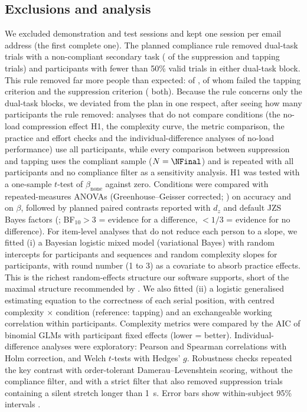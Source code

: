 \documentclass[11pt,a4paper]{article}
\begin{document}
\subsection{Exclusions and analysis}\label{sec:excl}
We excluded demonstration and test sessions and kept one session per email address (the first complete one). The planned
compliance rule removed dual-task trials with a non-compliant secondary task (\NInvalidTrials{} of the \NDualTrials{}
suppression and tapping trials) and participants with fewer than 50\% valid trials in either dual-task block. This rule
removed far more people than expected: \NExcluded{} of \NAll{}, of whom \NTapFail{} failed the tapping criterion and \NAsFail{}
the suppression criterion (\NBothFail{} both). Because the rule concerns only the dual-task blocks, we deviated from the plan
in one respect, after seeing how many participants the rule removed: analyses that do not compare conditions (the no-load compression effect
H1, the complexity curve, the metric comparison, the practice and effort checks and the individual-difference analyses of
no-load performance) use all \NAll{} participants, while every comparison between suppression and tapping uses the
compliant sample ($N = \NFinal$) and is repeated with all \NAll{} participants and no compliance filter as a sensitivity
analysis. H1 was tested with a one-sample $t$-test of $\beta_{\text{none}}$ against zero. Conditions were
compared with repeated-measures ANOVAs (Greenhouse--Geisser corrected; \citealp{greenhouse1959methods}) on accuracy and on
$\beta$, followed by planned paired contrasts reported with $d_z$ and default JZS Bayes factors (\citealp{rouder2009bayesian};
BF$_{10} > 3$ = evidence for a difference, $< 1/3$ = evidence for no difference). For item-level analyses that do not
reduce each person to a slope, we fitted (i) a Bayesian logistic mixed model (variational Bayes) with random intercepts for
participants and sequences and random complexity slopes for participants, with round number (1 to 3) as a covariate to
absorb practice effects. This is the richest random-effects structure our
software supports, short of the maximal structure recommended by \citet{barr2013random}. We also fitted (ii) a logistic generalised estimating equation \citep{liang1986longitudinal} to the
correctness of each serial position, with centred complexity $\times$ condition (reference: tapping) and an exchangeable working
correlation within participants. Complexity metrics were compared by the AIC of binomial GLMs with participant fixed effects
(lower = better). Individual-difference analyses were exploratory: Pearson and Spearman correlations with Holm correction, and
Welch $t$-tests with Hedges' $g$. Robustness checks repeated the key contrast with order-tolerant Damerau--Levenshtein scoring, without the compliance
filter, and with a strict filter that also removed suppression trials containing a silent stretch longer than 1~s. Error bars
show within-subject 95\% intervals \citep{cousineau2005confidence,morey2008confidence}.
\end{document}
